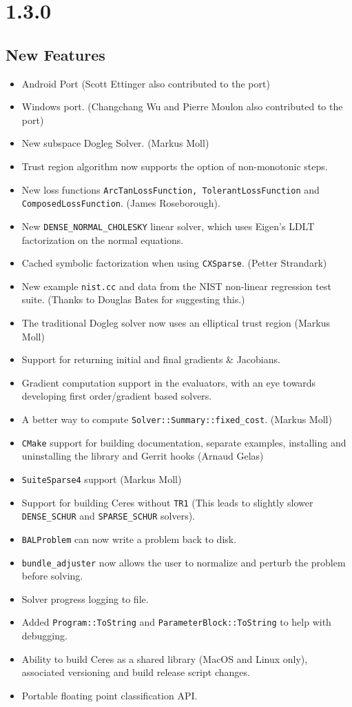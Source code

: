 \section*{1.3.0}
\subsection{New Features}
\begin{itemize}
\item Android Port (Scott Ettinger also contributed to the port)
\item Windows port. (Changchang Wu and Pierre Moulon also contributed to the port)
\item New subspace Dogleg Solver. (Markus Moll)
\item Trust region algorithm now supports the option of non-monotonic steps.
\item New loss functions \texttt{ArcTanLossFunction,
    TolerantLossFunction} and \texttt{ComposedLossFunction}. (James Roseborough).
\item New \texttt{DENSE\_NORMAL\_CHOLESKY} linear solver, which uses Eigen's
  LDLT factorization on the normal equations.
\item Cached symbolic factorization when using \texttt{CXSparse}.
  (Petter Strandark)
\item New example \texttt{nist.cc} and data from the NIST non-linear
  regression test suite. (Thanks to Douglas Bates for suggesting this.)
\item The traditional Dogleg solver now uses an elliptical trust
  region (Markus Moll)
\item Support for returning initial and final gradients \& Jacobians.
\item Gradient computation support in the evaluators, with an eye
  towards developing first order/gradient based solvers.
\item A better way to compute \texttt{Solver::Summary::fixed\_cost}. (Markus Moll)
\item \texttt{CMake} support for building documentation, separate examples,
  installing and uninstalling the library and Gerrit hooks (Arnaud
  Gelas)
\item \texttt{SuiteSparse4} support (Markus Moll)
\item Support for building Ceres without \texttt{TR1} (This leads to
  slightly slower \texttt{DENSE\_SCHUR} and \texttt{SPARSE\_SCHUR} solvers).
\item \texttt{BALProblem} can now write a problem back to disk.
\item \texttt{bundle\_adjuster} now allows the user to normalize and perturb the
  problem before solving.
\item Solver progress logging to file.
\item Added \texttt{Program::ToString} and
  \texttt{ParameterBlock::ToString}  to help with debugging.
\item Ability to build Ceres as a shared library (MacOS and Linux only), associated versioning and build release script changes.
\item Portable floating point classification API.
\end{itemize}

